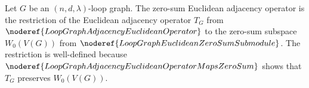 \begin{definition}
Let \(G\) be an \((n,d,\lambda)\)-loop graph.  The zero-sum Euclidean adjacency
operator is the restriction of the Euclidean adjacency operator
\(T_G\) from \(\noderef{LoopGraphAdjacencyEuclideanOperator}\) to the zero-sum
subspace \(W_0(V(G))\) from \(\noderef{LoopGraphEuclideanZeroSumSubmodule}\).
The restriction is well-defined because
\(\noderef{LoopGraphAdjacencyEuclideanOperatorMapsZeroSum}\) shows that
\(T_G\) preserves \(W_0(V(G))\).
\end{definition}
